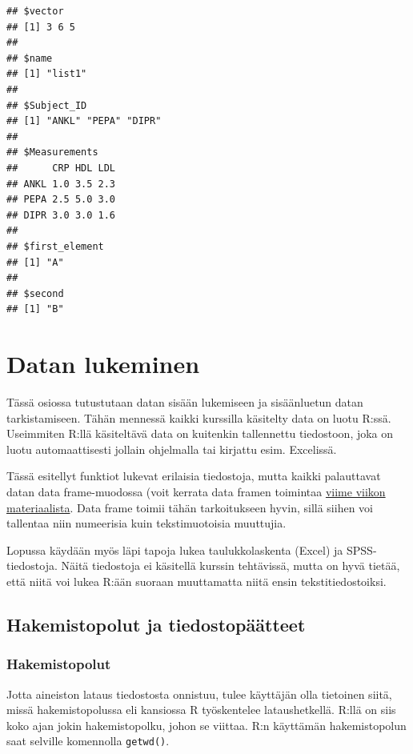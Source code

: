 \documentclass[
]{book}
\begin{document}
\begin{verbatim}
## $vector
## [1] 3 6 5
## 
## $name
## [1] "list1"
## 
## $Subject_ID
## [1] "ANKL" "PEPA" "DIPR"
## 
## $Measurements
##      CRP HDL LDL
## ANKL 1.0 3.5 2.3
## PEPA 2.5 5.0 3.0
## DIPR 3.0 3.0 1.6
## 
## $first_element
## [1] "A"
## 
## $second
## [1] "B"
\end{verbatim}

\hypertarget{reading_data}{%
\chapter{Datan lukeminen}\label{reading_data}}

Tässä osiossa tutustutaan datan sisään lukemiseen ja sisäänluetun datan tarkistamiseen. Tähän mennessä kaikki kurssilla käsitelty data on luotu R:ssä. Useimmiten R:llä käsiteltävä data on kuitenkin tallennettu tiedostoon, joka on luotu automaattisesti jollain ohjelmalla tai kirjattu esim. Excelissä.

Tässä esitellyt funktiot lukevat erilaisia tiedostoja, mutta kaikki palauttavat datan data frame-muodossa (voit kerrata data framen toimintaa \protect\hyperlink{data-frame}{viime viikon materiaalista}. Data frame toimii tähän tarkoitukseen hyvin, sillä siihen voi tallentaa niin numeerisia kuin tekstimuotoisia muuttujia.

Lopussa käydään myös läpi tapoja lukea taulukkolaskenta (Excel) ja SPSS-tiedostoja. Näitä tiedostoja ei käsitellä kurssin tehtävissä, mutta on hyvä tietää, että niitä voi lukea R:ään suoraan muuttamatta niitä ensin tekstitiedostoiksi.

\hypertarget{hakemistopolut-ja-tiedostopuxe4uxe4tteet}{%
\section{Hakemistopolut ja tiedostopäätteet}\label{hakemistopolut-ja-tiedostopuxe4uxe4tteet}}

\hypertarget{hakemistopolut}{%
\subsection{Hakemistopolut}\label{hakemistopolut}}

Jotta aineiston lataus tiedostosta onnistuu, tulee käyttäjän olla tietoinen siitä, missä hakemistopolussa eli kansiossa R työskentelee lataushetkellä. R:llä on siis koko ajan jokin hakemistopolku, johon se viittaa. R:n käyttämän hakemistopolun saat selville komennolla \texttt{getwd()}.
\end{document}
